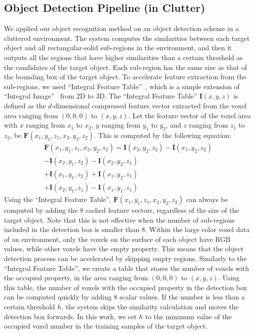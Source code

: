 \documentclass[conference]{sty/IEEEtran}
\begin{document}

\subsection{Object Detection Pipeline (in Clutter)}
\label{sec:recognition}
We applied our object recognition method on an object detection scheme in a cluttered environment.
The system computes the similarities between each target object and all rectangular-solid sub-regions in the environment, and then it outputs all the regions that have higher similarities than a certain threshold as the candidates of the target object.
Each sub-region has the same size as that of the bounding box of the target object.
To accelerate feature extraction from the sub-regions, we used ``Integral Feature Table''~\cite{kanezaki2010tvc}, which is a simple extension of ``Integral Image''~\cite{viola2001} from 2D to 3D.
The ``Integral Feature Table'' $\bm{I}(x,y,z)$ is defined as the $d$-dimensional compressed feature vector extracted from the voxel area
    ranging from $(0,0,0)$ to $(x,y,z)$.
Let the feature vector of the voxel area with $x$ ranging from $x_1$ to $x_2$,
    $y$ ranging from $y_1$ to $y_2$, and $z$ ranging from $z_1$ to $z_2$, be $\bm{F}(x_1,y_1,z_1,x_2,y_2,z_2)$.
This is computed by the following equation:
\begin{eqnarray*}\label{eq:sat}
\bm{F}(x_1,y_1,z_1,x_2,y_2,z_2) = \bm{I}(x_2,y_2,z_2) - \bm{I}(x_1,y_2,z_2)
                           \\ - \bm{I}(x_2,y_1,z_2) - \bm{I}(x_2,y_2,z_1)
                           \\ + \bm{I}(x_1,y_1,z_2) + \bm{I}(x_1,y_2,z_1)
                           \\ + \bm{I}(x_2,y_1,z_1) - \bm{I}(x_1,y_1,z_1)
\end{eqnarray*}
Using the ``Integral Feature Table'', $\bm{F}(x_1,y_1,z_1,x_2,y_2,z_2)$ can always be computed by adding the 8 cached feature vectors,
    regardless of the size of the target object.
Note that this is not effective when the number of sub-regions included in the detection box is smaller than 8.
Within the large color voxel data of an environment,
   only the voxels on the surface of each object have RGB values, while other voxels have the empty property.
This means that the object detection process can be accelerated by skipping empty regions.
Similarly to the ``Integral Feature Table'', we create a table that stores
   the number of voxels with the occupied property, in the area ranging from $(0,0,0)$ to $(x,y,z)$.
Using this table, the number of voxels with the occupied property in the detection box can be computed quickly by adding 8 scalar values.
If the number is less than a certain threshold $h$,
   the system skips the similarity calculation and moves the detection box forwards.
In this work, we set $h$ to the minimum value of the occupied voxel number in the training samples of the target object.
\end{document}
